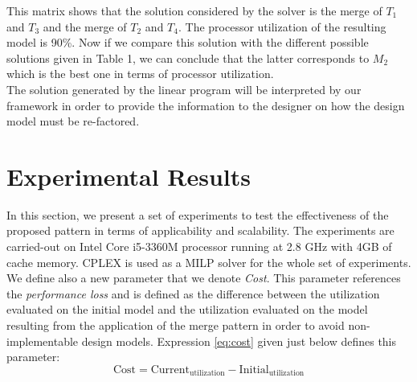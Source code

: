 \documentclass[runningheads,a4paper]{llncs}
\begin{document}
This matrix shows that the solution considered by the solver is the merge of $T_1$ and $T_3$ and the merge of $T_2$ and $T_4$. The processor utilization of the resulting model is 90\%. Now if we compare this solution with the different possible solutions given in Table 1, we can conclude that the latter corresponds to $M_2$ which is the best one in terms of processor utilization.\\     
The solution generated by the linear program will be interpreted by our framework in order to provide the information to the designer on how the design model must be re-factored.
\section{Experimental Results}

In this section, we present a set of experiments to test the effectiveness of the proposed pattern in terms of applicability and scalability. The experiments are carried-out on Intel Core i5-3360M processor running at 2.8 GHz with 4GB of cache memory. CPLEX is used as a MILP solver for the whole set of experiments. 
\\We define also a new parameter that we denote \emph{Cost}. This parameter references the \emph{performance loss} and is defined as the difference between the utilization evaluated on the initial model and the utilization evaluated on the model resulting from the application of the merge pattern in order to avoid non-implementable design models. Expression \ref{eq:cost} given just below defines this parameter:  
\begin{equation} \label{eq:cost}
\mathrm{Cost = Current_{utilization} - Initial_{utilization}}
\end{equation}
\end{document}

